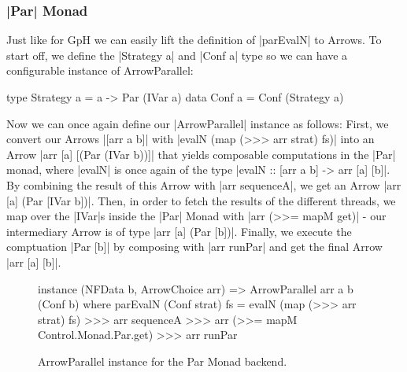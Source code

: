 \subsubsection{|Par| Monad}
Just like for GpH we can easily lift the definition of |parEvalN| to Arrows. To start off, we define the |Strategy a| and |Conf a| type so we can have a configurable instance of ArrowParallel:
\begin{code}
type Strategy a = a -> Par (IVar a)
data Conf a = Conf (Strategy a)
\end{code}
Now we can once again define our |ArrowParallel| instance as follows: First, we convert our Arrows |[arr a b]| with |evalN (map (>>> arr strat) fs)| into an Arrow |arr [a] [(Par (IVar b))]| that yields composable computations in the |Par| monad, where |evalN| is once again of the type |evalN :: [arr a b] -> arr [a] [b]|. By combining the result of this Arrow with |arr sequenceA|, we get an Arrow |arr [a] (Par [IVar b])|. Then, in order to fetch the results of the different threads, we map over the |IVar|s inside the |Par| Monad with |arr (>>= mapM get)| - our intermediary Arrow is of type |arr [a] (Par [b])|. Finally, we execute the comptuation |Par [b]| by composing with |arr runPar| and get the final Arrow |arr [a] [b]|.
\begin{figure}[h]
\begin{code}
instance (NFData b, ArrowChoice arr) => ArrowParallel arr a b (Conf b) where
    parEvalN (Conf strat) fs = evalN (map (>>> arr strat) fs) >>>
                    arr sequenceA >>>
                    arr (>>= mapM Control.Monad.Par.get) >>>
                    arr runPar
\end{code} %
\caption{ArrowParallel instance for the Par Monad backend.}
\label{fig:ArrowParallelParMonad}
\end{figure}

